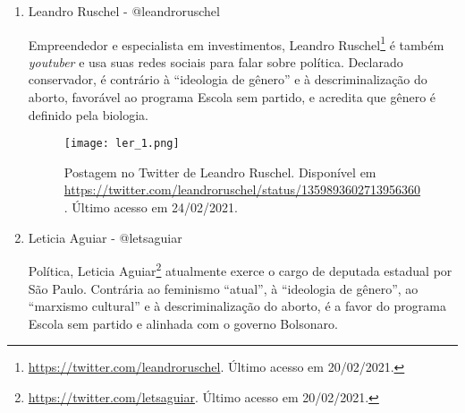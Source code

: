 \documentclass[
	12pt,				%
	openright,			%
	twoside,			%
	a4paper,			%
	english,			%
	brazil				%
	]{abntex2}
\begin{document}
\begin{anexosenv}
\begin{enumerate}
 Ex-colunista do jornal Folha de São Paulo e do \textit{The Huffington Post} Brasil, Kim Kataguiri\footnote{\url{https://twitter.com/KimKataguiri}. Último acesso em 20/02/2021.} é mais conhecido por ser cofundador e coordenador do Movimento Brasil Livre. Atualmente, é deputado federal por São Paulo. Contrário à ``ideologia de gênero'' e à descriminalização do aborto, acredita que a biologia define o gênero e é favorável ao programa Escola sem partido. Costuma fazer postagens em suas redes ironizando feministas e o próprio feminismo.
 
 \begin{figure}[!htbp]
    \centering
    \texttt{[image: kk\_1.png]}
    \caption{Postagem no Facebook de Kim Kataguiri. Disponível em \url{https://www.facebook.com/kataguiri.kim/posts/1846740348710489}. Último acesso em 24/02/2021.}
 \end{figure}
 
 \begin{figure}[!htbp]
    \centering
    \texttt{[image: kk\_2.png]}
    \caption{Postagem no Facebook de Kim Kataguiri. Disponível em \url{https://www.facebook.com/833053646745836/videos/421391445325536}. Último acesso em 24/02/2021.}
 \end{figure}
 
 \item Leandro Ruschel - @leandroruschel
 
 Empreendedor e especialista em investimentos, Leandro Ruschel\footnote{\url{https://twitter.com/leandroruschel}. Último acesso em 20/02/2021.} é também \textit{youtuber} e usa suas redes sociais para falar sobre política. Declarado conservador, é contrário à ``ideologia de gênero'' e à descriminalização do aborto, favorável ao programa Escola sem partido, e acredita que gênero é definido pela biologia.
 
 \begin{figure}[!htbp]
    \centering
    \texttt{[image: ler\_1.png]}
    \caption{Postagem no Twitter de Leandro Ruschel. Disponível em \url{https://twitter.com/leandroruschel/status/1359893602713956360}. Último acesso em 24/02/2021.}
 \end{figure}
 
 \item Leticia Aguiar - @letsaguiar
 
 Política, Leticia Aguiar\footnote{\url{https://twitter.com/letsaguiar}. Último acesso em 20/02/2021.} atualmente exerce o cargo de deputada estadual por São Paulo. Contrária ao feminismo ``atual'', à ``ideologia de gênero'', ao ``marxismo cultural'' e à descriminalização do aborto, é a favor do programa Escola sem partido e alinhada com o governo Bolsonaro.
 

\end{enumerate}
\end{anexosenv}
\end{document}

